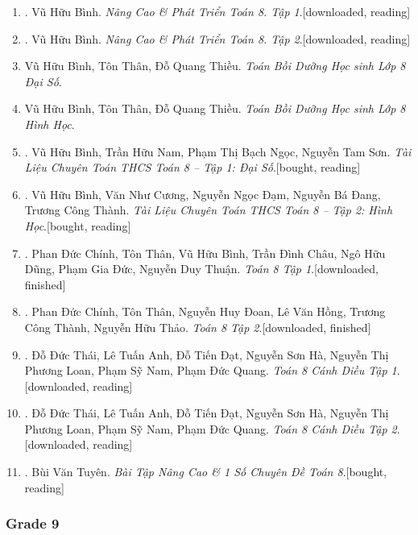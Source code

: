 \documentclass{article}
\begin{document}
\begin{enumerate}
	\item \cite{Binh_Toan_8_tap_1}. Vũ Hữu Bình. \textit{Nâng Cao \& Phát Triển Toán 8. Tập 1}.\hfill\textsf{[downloaded, reading]}
	\item \cite{Binh_Toan_8_tap_2}. Vũ Hữu Bình. \textit{Nâng Cao \& Phát Triển Toán 8. Tập 2}.\hfill\textsf{[downloaded, reading]}
	\item Vũ Hữu Bình, Tôn Thân, Đỗ Quang Thiều. \textit{Toán Bồi Dưỡng Học sinh Lớp 8 Đại Số}.
	\item Vũ Hữu Bình, Tôn Thân, Đỗ Quang Thiều. \textit{Toán Bồi Dưỡng Học sinh Lớp 8 Hình Học}.
	\item \cite{TLCT_THCS_Toan_8_dai_so}. Vũ Hữu Bình, Trần Hữu Nam, Phạm Thị Bạch Ngọc, Nguyễn Tam Sơn. \textit{Tài Liệu Chuyên Toán THCS Toán 8 -- Tập 1: Đại Số}.\hfill\textsf{[bought, reading]}
	\item \cite{TLCT_THCS_Toan_8_hinh_hoc}. Vũ Hữu Bình, Văn Như Cương, Nguyễn Ngọc Đạm, Nguyễn Bá Đang, Trương Công Thành. \textit{Tài Liệu Chuyên Toán THCS Toán 8 -- Tập 2: Hình Học}.\hfill\textsf{[bought, reading]}
	\item \cite{SGK_Toan_8_tap_1}. Phan Đức Chính, Tôn Thân, Vũ Hữu Bình, Trần Đình Châu, Ngô Hữu Dũng, Phạm Gia Đức, Nguyễn Duy
	Thuận. \textit{Toán 8 Tập 1}.\hfill\textsf{[downloaded, finished]}
	\item \cite{SGK_Toan_8_tap_2}. Phan Đức Chính, Tôn Thân, Nguyễn Huy Đoan, Lê Văn Hồng, Trương Công Thành, Nguyễn Hữu Thảo. \textit{Toán 8 Tập 2}.\hfill\textsf{[downloaded, finished]}
	\item \cite{SGK_Toan_8_Canh_Dieu_tap_1}. Đỗ Đức Thái, Lê Tuấn Anh, Đỗ Tiến Đạt, Nguyễn Sơn Hà, Nguyễn Thị Phương Loan, Phạm Sỹ Nam, Phạm Đức Quang. \textit{Toán 8 Cánh Diều Tập 1}.\hfill\textsf{[downloaded, reading]}
	\item \cite{SGK_Toan_8_Canh_Dieu_tap_2}. Đỗ Đức Thái, Lê Tuấn Anh, Đỗ Tiến Đạt, Nguyễn Sơn Hà, Nguyễn Thị Phương Loan, Phạm Sỹ Nam, Phạm Đức Quang. \textit{Toán 8 Cánh Diều Tập 2}.\hfill\textsf{[downloaded, reading]}
	\item \cite{Tuyen_Toan_8}. Bùi Văn Tuyên. \textit{Bài Tập Nâng Cao \& 1 Số Chuyên Đề Toán 8}.\hfill\textsf{[bought, reading]}
\end{enumerate}
	
\subsubsection{Grade 9}
\end{document}
